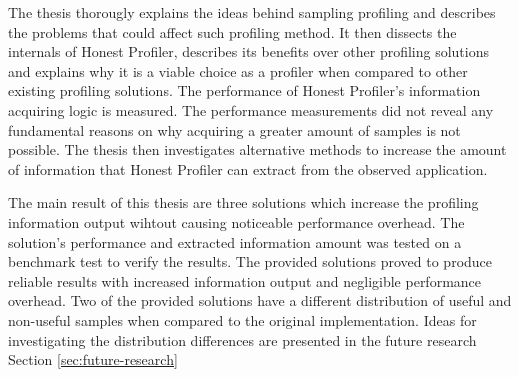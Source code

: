 \documentclass[..thesis.tex]{subfiles}
\begin{document}
The thesis thorougly explains the ideas behind sampling profiling and describes the problems that could affect such profiling method. It then dissects the internals of Honest Profiler, describes its benefits over other profiling solutions and explains why it is a viable choice as a profiler when compared to other existing profiling solutions. The performance of Honest Profiler's information acquiring logic is measured. The performance measurements did not reveal any fundamental reasons on why acquiring a greater amount of samples is not possible. The thesis then investigates alternative methods to increase the amount of information that  Honest Profiler can extract from the observed application.

The main result of this thesis are three solutions which increase the profiling information output wihtout causing noticeable performance overhead. The solution's performance and extracted information amount was tested on a benchmark test to verify the results. The provided solutions proved to produce reliable results with increased information output and negligible performance overhead. Two of the provided solutions have a different distribution of useful and non-useful samples when compared to the original implementation. Ideas for investigating the distribution differences are presented in the future research Section \ref{sec:future-research}

\end{document}
